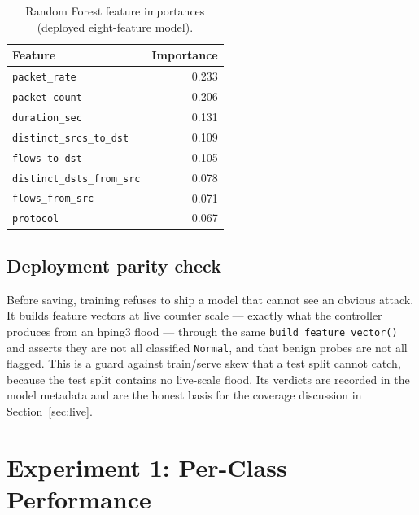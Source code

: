 \documentclass[11pt]{article}
\begin{document}
\begin{table}[h]
\centering
\caption{Random Forest feature importances (deployed eight-feature model).}
\label{tab:importance}
\begin{tabular}{lr}
\toprule
Feature & Importance \\
\midrule
\texttt{packet\_rate} & 0.233 \\
\texttt{packet\_count} & 0.206 \\
\texttt{duration\_sec} & 0.131 \\
\texttt{distinct\_srcs\_to\_dst} & 0.109 \\
\texttt{flows\_to\_dst} & 0.105 \\
\texttt{distinct\_dsts\_from\_src} & 0.078 \\
\texttt{flows\_from\_src} & 0.071 \\
\texttt{protocol} & 0.067 \\
\bottomrule
\end{tabular}
\end{table}

\subsection{Deployment parity check}
Before saving, training refuses to ship a model that cannot see an obvious attack. It
builds feature vectors at live counter scale --- exactly what the controller produces from
an hping3 flood --- through the same \texttt{build\_feature\_vector()} and asserts they are
not all classified \texttt{Normal}, and that benign probes are not all flagged. This is a
guard against train/serve skew that a test split cannot catch, because the test split
contains no live-scale flood. Its verdicts are recorded in the model metadata and are the
honest basis for the coverage discussion in Section~\ref{sec:live}.

\section{Experiment 1: Per-Class Performance}
\label{sec:perclass}
\end{document}
